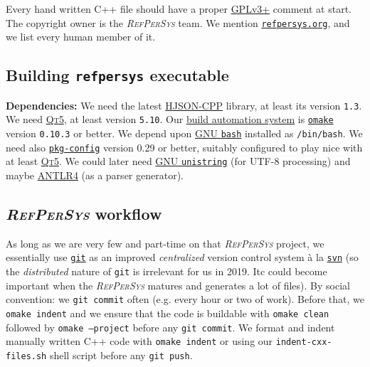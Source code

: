 \documentclass[11pt,a4paper,svgnames]{article}
\newcommand{\RefPerSys}{{\textit{\textsc{RefPerSys}}}}
\begin{document}
Every hand written C++ file should have a proper
\href{https://www.gnu.org/licenses/gpl-3.0.en.html}{GPLv3+} comment at
start.  The copyright owner is the {\RefPerSys} team. We mention
\href{http://refpersys.org/}{\texttt{refpersys.org}}, and we list
every human member of it.

\subsection{Building \texttt{refpersys} executable}
\label{subsec:building}

\textbf{Dependencies:} We need the latest
\href{https://github.com/hjson/hjson-cpp}{HJSON-CPP} library, at least
its version \texttt{1.3}.  We need \href{http://qt.io}{\textsc{Qt5}},
  at least version \texttt{5.10}. Our
  \href{https://en.wikipedia.org/wiki/Build_automation}{build
    automation system} is
  \href{http://projects.camlcity.org/projects/omake.html}{\texttt{omake}}
  version \texttt{0.10.3} or better.  We depend upon
  \href{https://www.gnu.org/software/bash/}{GNU \texttt{bash}}
  installed as \texttt{/bin/bash}.  We need also
  \href{https://www.freedesktop.org/wiki/Software/pkg-config/}{\texttt{pkg-config}}
  version 0.29 or better, suitably configured to play nice with at
  least \href{http://qt.io}{\textsc{Qt5}}.  We could later need
    \href{https://www.gnu.org/software/libunistring/}{GNU
      \texttt{unistring}} (for UTF-8 processing) and maybe
    \href{https://www.antlr.org/}{ANTLR4} (as a parser generator).

\subsection{{\RefPerSys} workflow}
\label{subsec:workflow}

As long as we are very few and part-time on that {\RefPerSys} project,
we essentially use \href{https://git-scm.com/}{\texttt{git}} as an
improved \textit{centralized} version control system à la
\href{https://subversion.apache.org/}{\texttt{svn}} (so the
\textit{distributed} nature of \texttt{git} is irrelevant for us in
2019. Itc could become important when the {\RefPerSys} matures and
generates a lot of files).  By social convention: we \texttt{git
  commit} often (e.g. every hour or two of work). Before that, we
\texttt{omake indent} and we ensure that the code is buildable with
\texttt{omake clean} followed by \texttt{omake --project} before any
\texttt{git commit}. We format and indent manually written C++ code
with \texttt{omake indent} or using our \texttt{indent-cxx-files.sh}
shell script before any \texttt{git push}.
\end{document}
